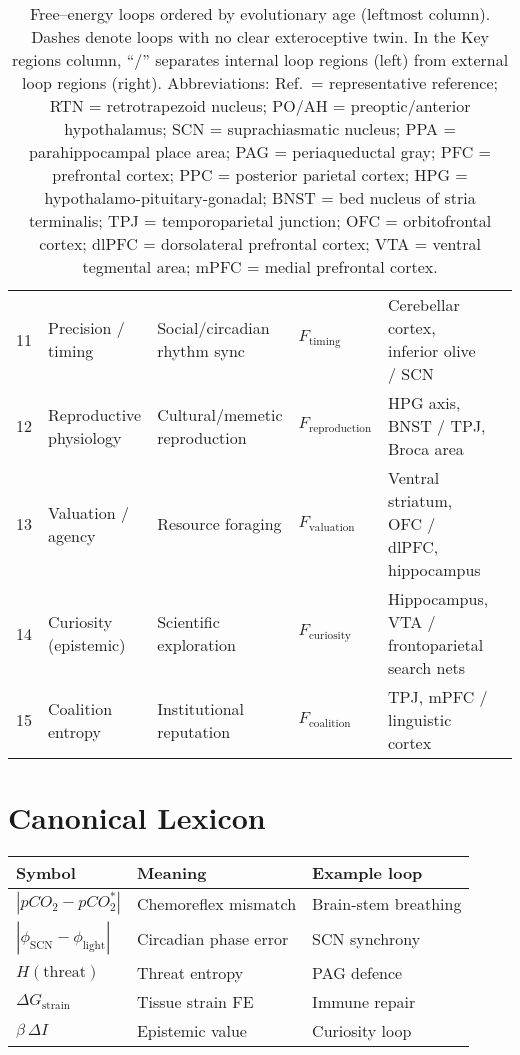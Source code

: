 \documentclass[10pt]{article}
\begin{document}
\begin{table}[ht]
\begin{tabular}{@{}r p{3.0cm} p{3.0cm} p{2.3cm} p{3.5cm} p{1.2cm}@{}}
11 & Precision / timing & Social/circadian rhythm sync & $F_{\text{timing}}$ & Cerebellar cortex, inferior olive / SCN & \cite{popa2018cerebellum}\\
12 & Reproductive physiology & Cultural/memetic reproduction & $F_{\text{reproduction}}$ & HPG axis, BNST / TPJ, Broca area & \cite{clarke2022hpg}\\
13 & Valuation / agency & Resource foraging & $F_{\text{valuation}}$ & Ventral striatum, OFC / dlPFC, hippocampus & \cite{sarter2023attention}\\
14 & Curiosity (epistemic) & Scientific exploration & $F_{\text{curiosity}}$ & Hippocampus, VTA / frontoparietal search nets & \cite{gruber2022curiosity}\\
15 & Coalition entropy & Institutional reputation & $F_{\text{coalition}}$ & TPJ, mPFC / linguistic cortex & \cite{scholz2023rtpj}\\

\bottomrule
\end{tabular}
\caption{Free--energy loops ordered by evolutionary age (leftmost column).  Dashes denote loops with no clear exteroceptive twin. In the Key regions column, ``/'' separates internal loop regions (left) from external loop regions (right).  Abbreviations: 
Ref.\ = representative reference; 
RTN = retrotrapezoid nucleus; 
PO/AH = preoptic/anterior hypothalamus;
SCN = suprachiasmatic nucleus; 
PPA = parahippocampal place area; 
PAG = periaqueductal gray; 
PFC = prefrontal cortex;
PPC = posterior parietal cortex; 
HPG = hypothalamo-pituitary-gonadal; 
BNST = bed nucleus of stria terminalis; 
TPJ = temporoparietal junction; 
OFC = orbitofrontal cortex; 
dlPFC = dorsolateral prefrontal cortex; 
VTA = ventral tegmental area; 
mPFC = medial prefrontal cortex.}
\label{tab:ledger}
\end{table}

\section{Canonical Lexicon}

\begin{tabular}{lll}
\textbf{Symbol} & \textbf{Meaning} & \textbf{Example loop} \\
\hline
$|pCO_2-pCO_2^{*}|$ & Chemoreflex mismatch & Brain‑stem breathing \\
$|\phi_{\mathrm{SCN}}-\phi_{\text{light}}|$ & Circadian phase error & SCN synchrony \\
$H(\text{threat})$ & Threat entropy & PAG defence \\
$\Delta G_{\text{strain}}$ & Tissue strain FE & Immune repair \\
$\beta\,\Delta I$ & Epistemic value & Curiosity loop \\
\hline
\end{tabular}
\end{document}
